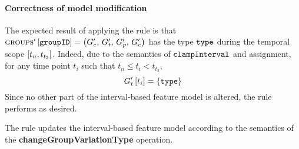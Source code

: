 \paragraph{Correctness of model modification}
The expected result of applying the rule is that $\textsc{groups}{}' \left[ \texttt{groupID} \right] = \left(G'_e,\, G'_t,\, G'_p,\, G'_c\right)$ has the type $\texttt{type}$ during the temporal scope $\interval{t_n}{t_{t_2}}$. Indeed, due to the semantics of $\texttt{clampInterval}$ and assignment, for any time point $t_i$ such that $t_n \leq t_i < t_{t_2}$,
\[
   G'_t \left[ t_i \right] = \left\{\texttt{type}\right\}
\]
Since no other part of the interval-based feature model is altered, the rule performs as desired.
\\

\begin{lemma}
   The  rule updates the interval-based feature model according to the semantics of the \textbf{changeGroupVariationType} operation.
   \label{lemma:change-group-variation-type-mod}
\end{lemma}
